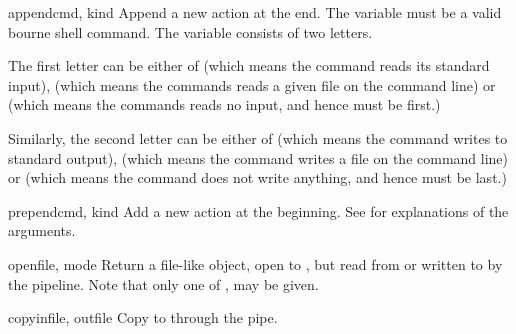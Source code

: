 \begin{methoddesc}[Template]{append}{cmd, kind}
Append a new action at the end. The  variable must be a valid
bourne shell command. The  variable consists of two letters.

The first letter can be either of  (which means the command
reads its standard input),  (which means the commands reads
a given file on the command line) or  (which means the commands
reads no input, and hence must be first.)

Similarly, the second letter can be either of  (which means 
the command writes to standard output),  (which means the 
command writes a file on the command line) or  (which means
the command does not write anything, and hence must be last.)
\end{methoddesc}

\begin{methoddesc}[Template]{prepend}{cmd, kind}
Add a new action at the beginning. See  for explanations
of the arguments.
\end{methoddesc}

\begin{methoddesc}[Template]{open}{file, mode}
Return a file-like object, open to , but read from or
written to by the pipeline.  Note that only one of ,
 may be given.
\end{methoddesc}

\begin{methoddesc}[Template]{copy}{infile, outfile}
Copy  to  through the pipe.
\end{methoddesc}
